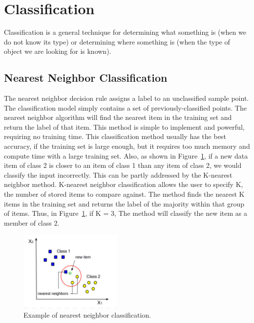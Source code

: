 \section{Classification}
\label{Classification}
Classification is a general technique for determining what something is (when we do not know its type) or determining where something is (when the type of object we are looking for is known).

\subsection{Nearest Neighbor Classification}
The nearest neighbor decision rule assigns a label to an unclassified sample point. The classification model simply contains a set of previously-classified points. The nearest neighbor algorithm will find the nearest item in the training set and return the label of that item. This method is simple to implement and powerful, requiring no training time. This classification method usually has the best accuracy, if the training set is large enough, but it requires too much memory and compute time with a large training set. Also, as shown in Figure~\ref{fig:knn}, if a new data item of class 2 is closer to an item of class 1 than any item of class 2, we would classify the input incorrectly. This can be partly addressed by the K-nearest neighbor method. K-nearest neighbor classification allows the user to specify K, the number of stored items to compare against. The method finds the nearest K items in the training set and returns the label of the majority within that group of items. Thus, in Figure~\ref{fig:knn}, if K = 3, The method will classify the new item as a member of class 2.  

\begin{figure}[t]
  \centering
  \includegraphics[width=2in]{figures/knn.jpg}   
  \caption[knn]{Example of nearest neighbor classification.}
  \label{fig:knn}
\end{figure}

